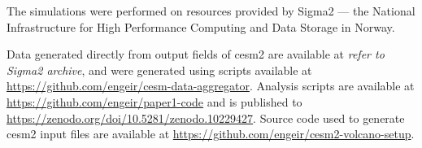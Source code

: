 \documentclass{ametsocV6.1}
\begin{document}
The simulations were performed on resources provided by Sigma2 --- the National
Infrastructure for High Performance Computing and Data Storage in Norway.

%
%
\datastatement{}

Data generated directly from output fields of \gls{cesm2} are available at \emph{refer
  to Sigma2 archive}, and were generated using scripts available at
\url{https://github.com/engeir/cesm-data-aggregator}. Analysis scripts are available at
\url{https://github.com/engeir/paper1-code} and is published to
\url{https://zenodo.org/doi/10.5281/zenodo.10229427}. Source code used to generate
\gls{cesm2} input files are available at
\url{https://github.com/engeir/cesm2-volcano-setup}.

%






%
\end{document}
